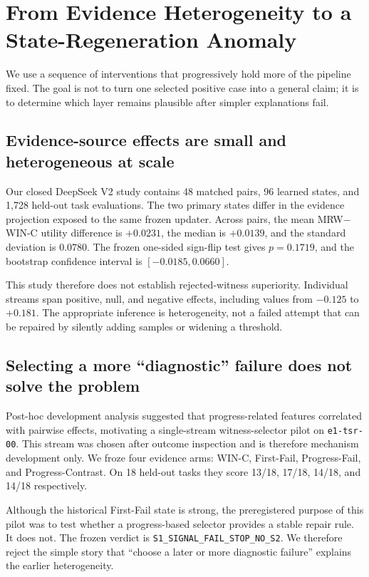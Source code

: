 \section{From Evidence Heterogeneity to a State-Regeneration Anomaly}
\label{sec:localization}

We use a sequence of interventions that progressively hold more of the pipeline fixed. The goal is not to turn one selected positive case into a general claim; it is to determine which layer remains plausible after simpler explanations fail.

\subsection{Evidence-source effects are small and heterogeneous at scale}
Our closed DeepSeek V2 study contains 48 matched pairs, 96 learned states, and 1,728 held-out task evaluations. The two primary states differ in the evidence projection exposed to the same frozen updater. Across pairs, the mean MRW$-$WIN-C utility difference is $+0.0231$, the median is $+0.0139$, and the standard deviation is $0.0780$. The frozen one-sided sign-flip test gives $p=0.1719$, and the bootstrap confidence interval is $[-0.0185,0.0660]$.

This study therefore does not establish rejected-witness superiority. Individual streams span positive, null, and negative effects, including values from $-0.125$ to $+0.181$. The appropriate inference is heterogeneity, not a failed attempt that can be repaired by silently adding samples or widening a threshold.

\subsection{Selecting a more ``diagnostic'' failure does not solve the problem}
Post-hoc development analysis suggested that progress-related features correlated with pairwise effects, motivating a single-stream witness-selector pilot on \texttt{e1-tsr-00}. This stream was chosen after outcome inspection and is therefore mechanism development only. We froze four evidence arms: WIN-C, First-Fail, Progress-Fail, and Progress-Contrast. On 18 held-out tasks they score 13/18, 17/18, 14/18, and 14/18 respectively.

Although the historical First-Fail state is strong, the preregistered purpose of this pilot was to test whether a progress-based selector provides a stable repair rule. It does not. The frozen verdict is \texttt{S1\_SIGNAL\_FAIL\_STOP\_NO\_S2}. We therefore reject the simple story that ``choose a later or more diagnostic failure'' explains the earlier heterogeneity.

